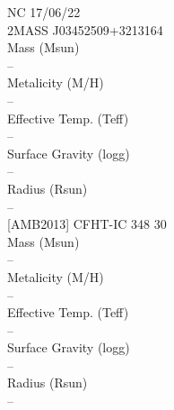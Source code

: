 NC 17/06/22\\
2MASS J03452509+3213164\\
Mass (Msun)\\
--\\
Metalicity (M/H)\\
--\\
Effective Temp. (Teff)\\
--\\
Surface Gravity (logg)\\
--\\
Radius (Rsun)\\
--\\

[AMB2013] CFHT-IC 348 30\\
Mass (Msun)\\
--\\
Metalicity (M/H)\\
--\\
Effective Temp. (Teff)\\
--\\
Surface Gravity (logg)\\
--\\
Radius (Rsun)\\
--\\

